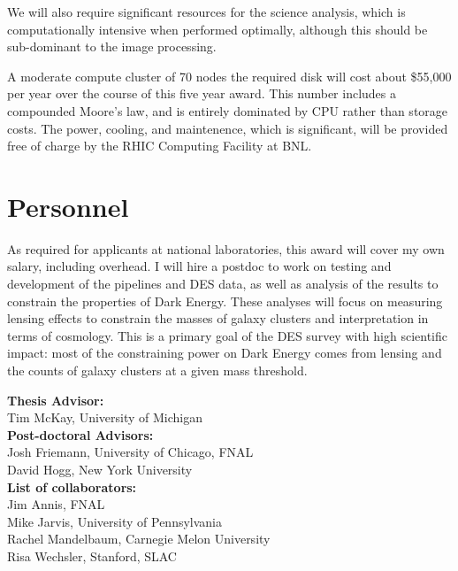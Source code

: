 \documentclass[12pt]{article}
\begin{document}
We will also require significant resources for the science analysis, which is
computationally intensive when performed optimally, although this should be
sub-dominant to the image processing.

A moderate compute cluster of 70 nodes the required disk will cost about
\$55,000 per year over the course of this five year award.  This number
includes a compounded Moore's law, and is entirely dominated by CPU rather than
storage costs.  The power, cooling, and maintenence, which is significant, will
be provided free of charge by the RHIC Computing Facility at BNL.

\section{Personnel}

As required for applicants at national laboratories, this award will cover my
own salary, including overhead.  I will hire a postdoc to work on testing and
development of the pipelines and DES data, as well as analysis of the results
to constrain the properties of Dark Energy.  These analyses will focus on
measuring lensing effects to constrain the masses of galaxy clusters and
interpretation in terms of cosmology.  This is a primary goal of the DES survey
with high scientific impact:  most of the constraining power on Dark Energy
comes from lensing and the counts of galaxy clusters at a given mass threshold.  

\newpage

\noindent
{\bf Thesis Advisor:}\\

Tim McKay, University of Michigan\\

\noindent
{\bf Post-doctoral Advisors:}\\

Josh Friemann, University of Chicago, FNAL\\

David Hogg, New York University\\

\noindent
{\bf List of collaborators:}\\

Jim Annis, FNAL\\

Mike Jarvis, University of Pennsylvania\\

Rachel Mandelbaum, Carnegie Melon University\\

Risa Wechsler, Stanford, SLAC
\end{document}
